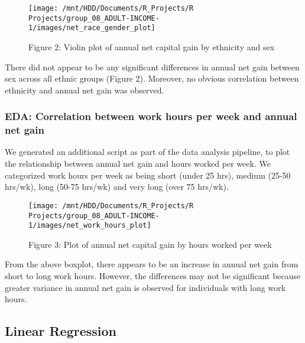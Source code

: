 \documentclass[]{article}
\begin{document}
\begin{figure}

{\centering \texttt{[image: /mnt/HDD/Documents/R\_Projects/R Projects/group\_08\_ADULT-INCOME-1/images/net\_race\_gender\_plot]} 

}

\caption{Figure 2: Violin plot of annual net capital gain by ethnicity and sex}\label{fig:net-race-gender}
\end{figure}

There did not appear to be any significant differences in annual net
gain between sex across all ethnic groups (Figure 2). Moreover, no
obvious correlation between ethnicity and annual net gain was observed.

\hypertarget{eda-correlation-between-work-hours-per-week-and-annual-net-gain}{%
\subsubsection{EDA: Correlation between work hours per week and annual
net
gain}\label{eda-correlation-between-work-hours-per-week-and-annual-net-gain}}

We generated an additional script as part of the data analysis pipeline,
to plot the relationship between annual net gain and hours worked per
week. We categorized work hours per week as being short (under 25 hrs),
medium (25-50 hrs/wk), long (50-75 hrs/wk) and very long (over 75
hrs/wk).

\begin{figure}

{\centering \texttt{[image: /mnt/HDD/Documents/R\_Projects/R Projects/group\_08\_ADULT-INCOME-1/images/net\_work\_hours\_plot]} 

}

\caption{Figure 3: Plot of annual net capital gain by hours worked per week}\label{fig:work-hours-plot}
\end{figure}

From the above boxplot, there appears to be an increase in annual net
gain from short to long work hours. However, the differences may not be
significant because greater variance in annual net gain is observed for
individuals with long work hours.

\hypertarget{linear-regression}{%
\subsection{Linear Regression}\label{linear-regression}}
\end{document}

